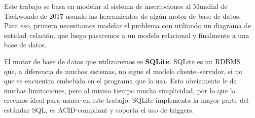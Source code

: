 Este trabajo se basa en modelar al sistema de inscripciones al Mundial de Taekwondo de 2017 usando las herramientas de algún motor de base de datos.
Para eso, primero necesitamos modelar el problema con utiliando un diagrama de entidad--relación, que luego pasaremos a un modelo relacional y finalmente a una base de datos.

El motor de base de datos que utilizaremos es \textbf{SQLite}. SQLite es un RDBMS que, a diferencia de muchos sistemas, no sigue el modelo cliente--servidor, si no que se encuentra embebido en el programa que la usa. Esto obviamente le da muchas limitaciones, pero al mismo tiempo mucha simplicidad, por lo que la creemos ideal para usarse en este trabajo.
SQLite implementa la mayor parte del estándar SQL, es ACID-compliant y soporta el uso de triggers.

